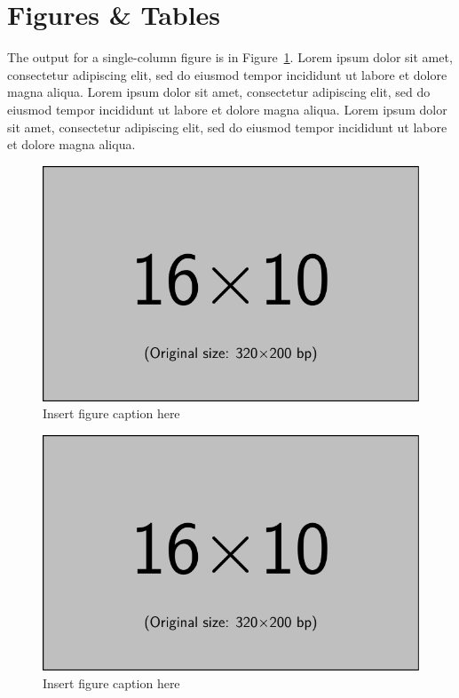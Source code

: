 \documentclass[
  journal=large,
  manuscript=propuesta,
  year=2020,
  volume=37,
]{cup-journal}
\begin{document}
\section{Figures \& Tables}

The output for a single-column figure is in Figure~\ref{fig_sim}.  Lorem ipsum dolor sit amet, consectetur adipiscing elit, sed do eiusmod tempor incididunt ut labore et dolore magna aliqua. Lorem ipsum dolor sit amet, consectetur adipiscing elit, sed do eiusmod tempor incididunt ut labore et dolore magna aliqua. Lorem ipsum dolor sit amet, consectetur adipiscing elit, sed do eiusmod tempor incididunt ut labore et dolore magna aliqua.



\begin{figure}[hbt!]
\centering
\includegraphics[width=0.75\linewidth]{example-image-16x10.pdf}
\caption{Insert figure caption here}
\label{fig_sim}
\end{figure}


\begin{figure}
\centering
\includegraphics[width=0.8\linewidth]{example-image-16x10.pdf}
\caption{Insert figure caption here}
\label{fig_wide}
\end{figure}
\end{document}
